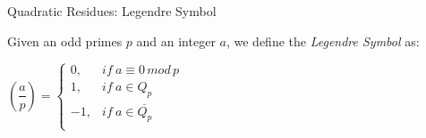 \documentclass{beamer}
\begin{document}


\begin{frame}{Quadratic Residues: Legendre Symbol}
\begin{definition}
	Given an odd primes $p$ and an integer $a$, we define the \textit{Legendre Symbol} as:
	
	\begin{center}
		$
		\left( \dfrac{a}{p} \right) =
		\begin{cases}
		0, & if\ a \equiv 0 \, mod \, p\\
		1, & if\ a \in Q_p  \\
		-1, & if\ a \in \overline{Q_p} \\
		\end{cases}
		$
	\end{center}
\end{definition}
\end{frame}


%		
\end{document}
